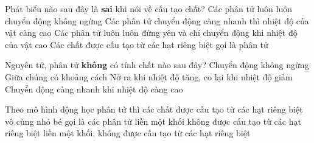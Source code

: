 

\begin{ex}
	Phát biểu nào sau đây là \textbf{sai} khi nói về cấu tạo chất?	
	\choice
	{Các phân tử luôn luôn chuyển động không ngừng}
	{Các phân tử chuyển động càng nhanh thì nhiệt độ của vật càng cao}
	{\True Các phân tử luôn luôn đứng yên và chỉ chuyển động khi nhiệt độ của vật cao}
	{Các chất được cấu tạo từ các hạt riêng biệt gọi là phân tử}
	\end{ex}

\begin{ex}
	Nguyên tử, phân tử \textbf{không} có tính chất nào sau đây?
	\choice
	{Chuyển động không ngừng}
	{Giữa chúng có khoảng cách}
	{\True Nở ra khi nhiệt độ tăng, co lại khi nhiệt độ giảm}
	{Chuyển động càng nhanh khi nhiệt độ càng cao}
	\end{ex}


\begin{ex}
	Theo mô hình động học phân tử thì các chất
	\choice
	{\True được cấu tạo từ các hạt riêng biệt vô cùng nhỏ bé gọi là các phân tử}
	{liền một khối}
	{không được cấu tạo từ các hạt riêng biệt}
	{liền một khối, không được cấu tạo từ các hạt riêng biệt}
	\end{ex}

